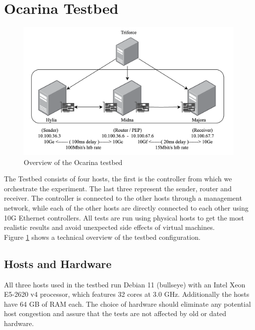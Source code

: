\documentclass[a4paper,english, 11pt]{report}
\begin{document}


\section{Ocarina Testbed}
\begin{figure}[h!] %
	\centering
	\includegraphics[scale=0.60]{../diagrams/drawio/testbed.png}
  	\caption{Overview of the Ocarina testbed}
  	\label{fig:testbed}
\end{figure}

The Testbed consists of four hosts, the first is the controller from which we orchestrate the experiment. The last three represent the sender, router and receiver. The controller is connected to the other hosts through a management network, while each of the other hosts are directly connected to each other using 10G Ethernet controllers. All tests are run using physical hosts to get the most realistic results and avoid unexpected side effects of virtual machines.\\

Figure \ref{fig:testbed} shows a technical overview of the testbed configuration.

\subsection{Hosts and Hardware}
All three hosts used in the testbed run Debian 11 (bullseye) with an Intel Xeon E5-2620 v4 processor, which features 32 cores at 3.0 GHz. Additionally the hosts have 64 GB of RAM each. The choice of hardware should eliminate any potential host congestion \cite{Agarwal_Krishnamurthy_Agarwal_2023} and assure that the tests are not affected by old or dated hardware.\\
\end{document}
